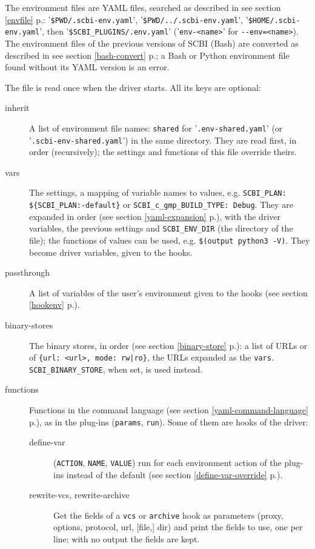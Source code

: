 \documentclass[a4paper,12pt,twoside]{article}
\newcommand{\code}[1]{\texttt{#1}}
\newcommand{\seeref}[1]{see section \ref{#1} p.\pageref{#1}}
\newcommand{\file}[1]{'{\texttt{#1}}'}
\newcommand{\ddash}{-{}-}
\begin{document}
The environment files are YAML files, searched as described in
\seeref{envfile}:
\file{\$PWD/.scbi-env.yaml}, \file{\$PWD/../.scbi-env.yaml},
\file{\$HOME/.scbi-env.yaml}, then \file{\$SCBI\_PLUGINS/.env.yaml}
(\file{env-<name>} for \code{\ddash{}env=<name>}). The environment files
of the previous versions of SCBI (Bash) are converted as described in
\seeref{bash-convert}; a Bash or Python environment file found without
its YAML version is an error.

The file is read once when the driver starts. All its keys are optional:

\begin{description}
	\item[inherit] A list of environment file names: \code{shared} for
	\file{.env-shared.yaml} (or \file{.scbi-env-shared.yaml}) in the same
	directory. They are read first, in order (recursively); the settings and
	functions of this file override theirs.
	\item[vars] The settings, a mapping of variable names to values, e.g.
	\code{SCBI\_PLAN: \$\{SCBI\_PLAN:-default\}} or
	\code{SCBI\_c\_gmp\_BUILD\_TYPE: Debug}. They are expanded in order
	(\seeref{yaml-expansion}), with the driver variables, the previous
	settings and \code{SCBI\_ENV\_DIR} (the directory of the file); the
	functions of values can be used, e.g. \code{\$(output python3 -V)}.
	They become driver variables, given to the hooks.
	\item[passthrough] A list of variables of the user's environment given
	to the hooks (\seeref{hookenv}).
	\item[binary-stores] The binary stores, in order (\seeref{binary-store}):
	a list of URLs or of \code{\{url: <url>, mode: rw|ro\}}, the URLs
	expanded as the \code{vars}. \code{SCBI\_BINARY\_STORE}, when set,
	is used instead.
	\item[functions] Functions in the command language
	(\seeref{yaml-command-language}), as in the plug-ins (\code{params},
	\code{run}). Some of them are hooks of the driver:
	\begin{description}
		\item[define-var] (\code{ACTION}, \code{NAME}, \code{VALUE}) run for
		each environment action of the plug-ins instead of the default
		(\seeref{define-var-override}).
		\item[rewrite-vcs, rewrite-archive] Get the fields of a \code{vcs} or
		\code{archive} hook as parameters (proxy, options, protocol, url,
		[file,] dir) and print the fields to use, one per line; with no
		output the fields are kept.

\end{description}
\end{description}
\end{document}
